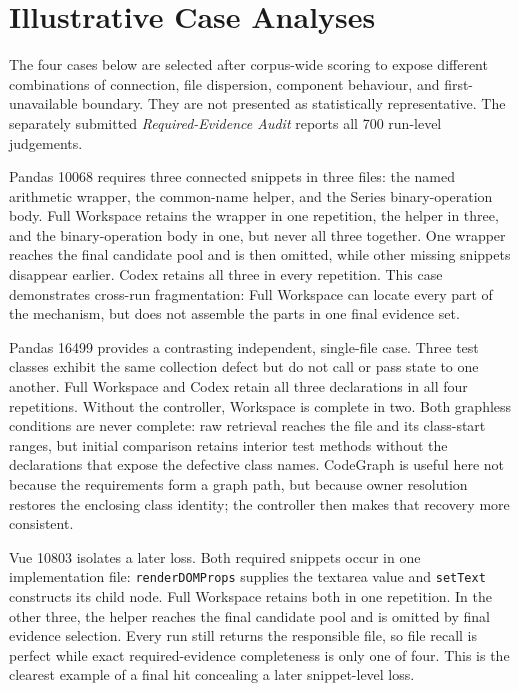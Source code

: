 \section{Illustrative Case Analyses}\label{sec:illustrative-case-analyses}

The four cases below are selected after corpus-wide scoring to expose different combinations of connection, file dispersion, component behaviour, and first-unavailable boundary. They are not presented as statistically representative. The separately submitted \emph{Required-Evidence Audit} reports all 700 run-level judgements.

Pandas 10068 requires three connected snippets in three files: the named arithmetic wrapper, the common-name helper, and the Series binary-operation body. Full Workspace retains the wrapper in one repetition, the helper in three, and the binary-operation body in one, but never all three together. One wrapper reaches the final candidate pool and is then omitted, while other missing snippets disappear earlier. Codex retains all three in every repetition. This case demonstrates cross-run fragmentation: Full Workspace can locate every part of the mechanism, but does not assemble the parts in one final evidence set.

Pandas 16499 provides a contrasting independent, single-file case. Three test classes exhibit the same collection defect but do not call or pass state to one another. Full Workspace and Codex retain all three declarations in all four repetitions. Without the controller, Workspace is complete in two. Both graphless conditions are never complete: raw retrieval reaches the file and its class-start ranges, but initial comparison retains interior test methods without the declarations that expose the defective class names. CodeGraph is useful here not because the requirements form a graph path, but because owner resolution restores the enclosing class identity; the controller then makes that recovery more consistent.

Vue 10803 isolates a later loss. Both required snippets occur in one implementation file: \texttt{renderDOMProps} supplies the textarea value and \texttt{setText} constructs its child node. Full Workspace retains both in one repetition. In the other three, the helper reaches the final candidate pool and is omitted by final evidence selection. Every run still returns the responsible file, so file recall is perfect while exact required-evidence completeness is only one of four. This is the clearest example of a final hit concealing a later snippet-level loss.

